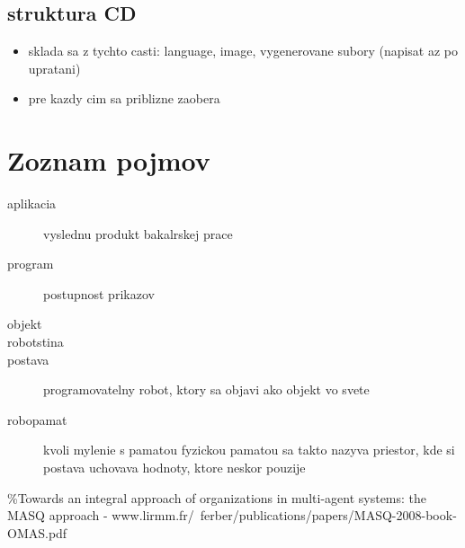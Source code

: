 \documentclass[a4paper,11pt,final]{report}
\begin{document}
\section{struktura CD}
\begin{itemize}
\item sklada sa z tychto casti: language, image, vygenerovane subory (napisat az po upratani)
\item pre kazdy cim sa priblizne zaobera
\end{itemize}
\chapter{Zoznam pojmov}
\begin{description}
\item[aplikacia] \newline %
vyslednu produkt bakalrskej prace
\item[program] \newline 
postupnost prikazov
\item[objekt]
\item[robotstina]
\item[postava]
programovatelny robot, ktory sa objavi ako objekt vo svete
\item[robopamat]
        kvoli mylenie s pamatou fyzickou pamatou sa takto nazyva priestor, kde si postava uchovava hodnoty, ktore neskor pouzije
\end{description}
\%Towards an integral approach of organizations in multi-agent systems: the MASQ approach - www.lirmm.fr/~ferber/publications/papers/MASQ-2008-book-OMAS.pdf
\end{document}
